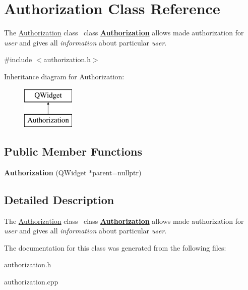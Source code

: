 \hypertarget{class_authorization}{}\section{Authorization Class Reference}
\label{class_authorization}


The \mbox{\hyperlink{class_authorization}{Authorization}} class~\newline
class {\bfseries{\mbox{\hyperlink{class_authorization}{Authorization}}}} allows made authorization for {\itshape user} and gives all {\itshape information} about particular {\itshape user}.  




{\ttfamily \#include $<$authorization.\+h$>$}

Inheritance diagram for Authorization\+:\begin{figure}[H]
\begin{center}
\leavevmode
\includegraphics[height=2.000000cm]{class_authorization}
\end{center}
\end{figure}
\subsection*{Public Member Functions}
\begin{DoxyCompactItemize}
\item 
\mbox{\label{class_authorization_a34074bc5fee249ed123171332ee03826}} 
{\bfseries Authorization} (Q\+Widget $\ast$parent=nullptr)
\end{DoxyCompactItemize}


\subsection{Detailed Description}
The \mbox{\hyperlink{class_authorization}{Authorization}} class~\newline
class {\bfseries{\mbox{\hyperlink{class_authorization}{Authorization}}}} allows made authorization for {\itshape user} and gives all {\itshape information} about particular {\itshape user}. 

The documentation for this class was generated from the following files\+:\begin{DoxyCompactItemize}
\item 
authorization.\+h\item 
authorization.\+cpp\end{DoxyCompactItemize}
